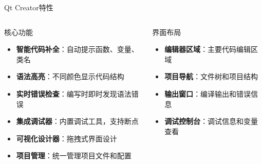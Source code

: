\documentclass[UTF8,aspectratio=169]{beamer}
\begin{document}
\begin{frame}{Qt Creator特性}
    \begin{columns}
        \begin{column}{0.58\textwidth}
            \begin{ytublock}{核心功能}
                \begin{itemize}
                    \item \textbf{智能代码补全}：自动提示函数、变量、类名
                    \item \textbf{语法高亮}：不同颜色显示代码结构
                    \item \textbf{实时错误检查}：编写时即时发现语法错误
                    \item \textbf{集成调试器}：内置调试工具，支持断点
                    \item \textbf{可视化设计器}：拖拽式界面设计
                    \item \textbf{项目管理}：统一管理项目文件和配置
                \end{itemize}
            \end{ytublock}
        \end{column}
        \hspace{0.02\textwidth}
        \begin{column}{0.38\textwidth}
            \begin{ytublock}{界面布局}
                \begin{itemize}
                    \item \textbf{编辑器区域}：主要代码编辑区域
                    \item \textbf{项目导航}：文件树和项目结构
                    \item \textbf{输出窗口}：编译输出和错误信息
                    \item \textbf{调试控制台}：调试信息和变量查看
                \end{itemize}
            \end{ytublock}
        \end{column}
    \end{columns}
\end{frame}
\end{document}
